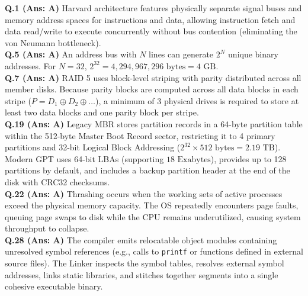 \begin{solutionbox}
\textbf{Q.1 (Ans: A)} Harvard architecture features physically separate signal buses and memory address spaces for instructions and data, allowing instruction fetch and data read/write to execute concurrently without bus contention (eliminating the von Neumann bottleneck).\\[2mm]
\textbf{Q.5 (Ans: A)} An address bus with $N$ lines can generate $2^N$ unique binary addresses. For $N = 32$, $2^{32} = 4,294,967,296\text{ bytes} = 4\text{ GB}$.\\[2mm]
\textbf{Q.7 (Ans: A)} RAID 5 uses block-level striping with parity distributed across all member disks. Because parity blocks are computed across all data blocks in each stripe ($P = D_1 \oplus D_2 \oplus \dots$), a minimum of 3 physical drives is required to store at least two data blocks and one parity block per stripe.\\[2mm]
\textbf{Q.19 (Ans: A)} Legacy MBR stores partition records in a 64-byte partition table within the 512-byte Master Boot Record sector, restricting it to 4 primary partitions and 32-bit Logical Block Addressing ($2^{32} \times 512\text{ bytes} = 2.19\text{ TB}$). Modern GPT uses 64-bit LBAs (supporting $18\text{ Exabytes}$), provides up to 128 partitions by default, and includes a backup partition header at the end of the disk with CRC32 checksums.\\[2mm]
\textbf{Q.22 (Ans: A)} Thrashing occurs when the working sets of active processes exceed the physical memory capacity. The OS repeatedly encounters page faults, queuing page swaps to disk while the CPU remains underutilized, causing system throughput to collapse.\\[2mm]
\textbf{Q.28 (Ans: A)} The compiler emits relocatable object modules containing unresolved symbol references (e.g., calls to \texttt{printf} or functions defined in external source files). The Linker inspects the symbol tables, resolves external symbol addresses, links static libraries, and stitches together segments into a single cohesive executable binary.
\end{solutionbox}

\newpage
